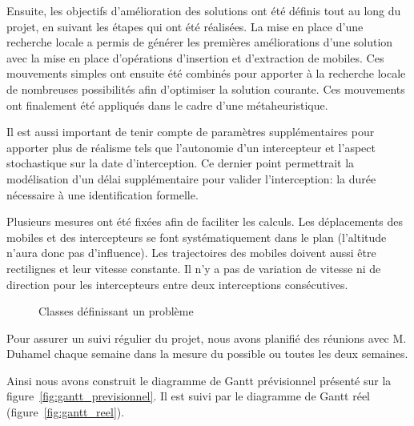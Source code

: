 		Ensuite, les objectifs d'amélioration des solutions ont été définis tout au long du projet, en suivant les étapes qui ont été réalisées. La mise en place d'une recherche locale a permis de générer les premières améliorations d'une solution avec la mise en place d'opérations d'insertion et d'extraction de mobiles. Ces mouvements simples ont ensuite été combinés pour apporter à la recherche locale de nombreuses possibilités afin d'optimiser la solution courante. Ces mouvements ont finalement été appliqués dans le cadre d'une métaheuristique.
		
		Il est aussi important de tenir compte de paramètres supplémentaires pour apporter plus de réalisme tels que l'autonomie d'un intercepteur et l'aspect stochastique sur la date d'interception. Ce dernier point permettrait la modélisation d'un délai supplémentaire pour valider l'interception: la durée nécessaire à une identification formelle.
		
		
		Plusieurs mesures ont été fixées afin de faciliter les calculs. Les déplacements des mobiles et des intercepteurs se font systématiquement dans le plan (l'altitude n'aura donc pas d'influence). Les trajectoires des mobiles doivent aussi être rectilignes et leur vitesse constante. Il n'y a pas de variation de vitesse ni de direction pour les intercepteurs entre deux interceptions consécutives.

		\begin{figure}[h!]
			\centering
			\begin{tikzpicture}
				
			\end{tikzpicture}
			\caption{Classes définissant un problème}
			\label{fig:problem-uml}
		\end{figure}

		Pour assurer un suivi régulier du projet, nous avons planifié des réunions avec M. Duhamel chaque semaine dans la mesure du possible ou toutes les deux semaines.

		Ainsi nous avons construit le diagramme de Gantt prévisionnel présenté sur la figure~\ref{fig:gantt_previsionnel}. Il est suivi par le diagramme de Gantt réel (figure~\ref{fig:gantt_reel}).

		
		
